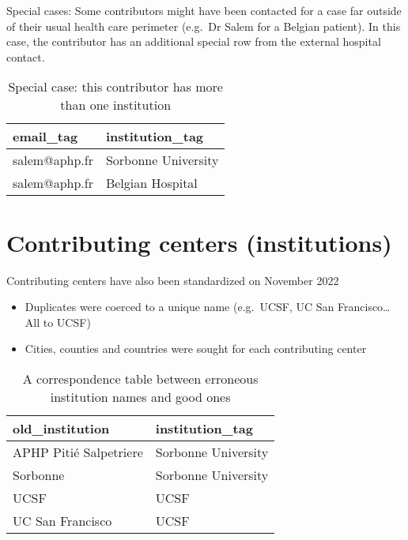 \documentclass[
]{book}
\begin{document}
Special cases: Some contributors might have been contacted for a case far outside of their usual health care perimeter (e.g.~Dr Salem for a Belgian patient). In this case, the contributor has an additional special row from the external hospital contact.

\begin{table}

\caption{\label{tab:unnamed-chunk-9}Special case: this contributor has more than one institution}
\centering
\begin{tabular}[t]{l|l}
\hline
email\_tag & institution\_tag\\
\hline
salem@aphp.fr & Sorbonne University\\
\hline
salem@aphp.fr & Belgian Hospital\\
\hline
\end{tabular}
\end{table}

\hypertarget{contributing-centers-institutions}{%
\section{Contributing centers (institutions)}\label{contributing-centers-institutions}}

Contributing centers have also been standardized on November 2022

\begin{itemize}
\item
  Duplicates were coerced to a unique name (e.g.~UCSF, UC San Francisco\ldots{} All to UCSF)
\item
  Cities, counties and countries were sought for each contributing center
\end{itemize}

\begin{table}

\caption{\label{tab:unnamed-chunk-10}A correspondence table between erroneous institution names and good ones}
\centering
\begin{tabular}[t]{l|l}
\hline
old\_institution & institution\_tag\\
\hline
APHP Pitié Salpetriere & Sorbonne University\\
\hline
Sorbonne & Sorbonne University\\
\hline
UCSF & UCSF\\
\hline
UC San Francisco & UCSF\\
\hline
\end{tabular}
\end{table}
\end{document}
